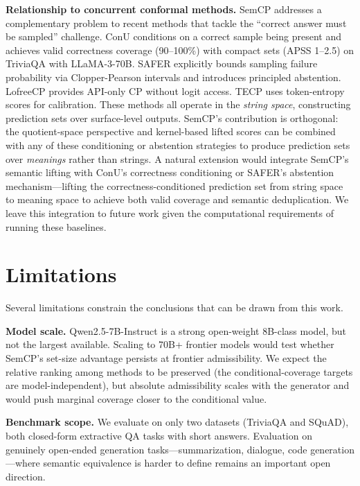\documentclass{article}
\begin{document}
\textbf{Relationship to concurrent conformal methods.} SemCP addresses a complementary problem to recent methods that tackle the ``correct answer must be sampled'' challenge. ConU \cite{wang2024conu} conditions on a correct sample being present and achieves valid correctness coverage (90--100\%) with compact sets (APSS 1--2.5) on TriviaQA with LLaMA-3-70B. SAFER \cite{kumar2025safer} explicitly bounds sampling failure probability via Clopper-Pearson intervals and introduces principled abstention. LofreeCP \cite{su2024lofreecp} provides API-only CP without logit access. TECP \cite{huang2025tecp} uses token-entropy scores for calibration. These methods all operate in the \emph{string space}, constructing prediction sets over surface-level outputs. SemCP's contribution is orthogonal: the quotient-space perspective and kernel-based lifted scores can be combined with any of these conditioning or abstention strategies to produce prediction sets over \emph{meanings} rather than strings. A natural extension would integrate SemCP's semantic lifting with ConU's correctness conditioning or SAFER's abstention mechanism---lifting the correctness-conditioned prediction set from string space to meaning space to achieve both valid coverage and semantic deduplication. We leave this integration to future work given the computational requirements of running these baselines.

\section{Limitations}

\label{sec:limitations}

Several limitations constrain the conclusions that can be drawn from this work.

\textbf{Model scale.} Qwen2.5-7B-Instruct is a strong open-weight 8B-class model, but not the largest available. Scaling to 70B+ frontier models would test whether SemCP's set-size advantage persists at frontier admissibility. We expect the relative ranking among methods to be preserved (the conditional-coverage targets are model-independent), but absolute admissibility scales with the generator and would push marginal coverage closer to the conditional value.

\textbf{Benchmark scope.} We evaluate on only two datasets (TriviaQA and SQuAD), both closed-form extractive QA tasks with short answers. Evaluation on genuinely open-ended generation tasks---summarization, dialogue, code generation---where semantic equivalence is harder to define remains an important open direction.
\end{document}

